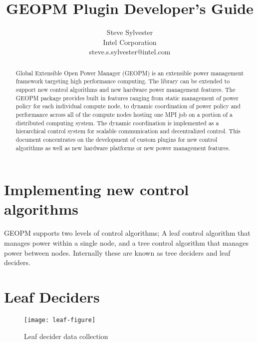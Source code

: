 \documentclass[11pt]{article}
\begin{document}
\sloppy
\title{GEOPM Plugin Developer's Guide}
\author{Steve Sylvester\\
        Intel Corporation\\
        \small{steve.s.sylvester@intel.com}}
\maketitle
\begin{abstract}
Global Extensible Open Power Manager (GEOPM) is an extensible
power management framework targeting high performance computing. The
library can be extended to support new control algorithms and new
hardware power management features. The GEOPM package provides built
in features ranging from static management of power policy for each
individual compute node, to dynamic coordination of power policy and
performance across all of the compute nodes hosting one MPI job on a
portion of a distributed computing system. The dynamic coordination is
implemented as a hierarchical control system for scalable
communication and decentralized control. This document concentrates on
the development of custom plugins for new control algorithms as well
as new hardware platforms or new power management features.
\end{abstract}

\section{Implementing new control algorithms}
GEOPM supports two levels of control algorithms; A leaf control
algorithm that manages power within a single node, and a tree control
algorithm that manages power between nodes. Internally these are known
as tree deciders and leaf deciders.

\section{Leaf Deciders}
\begin{figure} [H]
  \centering
  \texttt{[image: leaf-figure]}
  \caption{Leaf decider data collection}
  \label{fig:leaf}
\end{figure}
\end{document}
